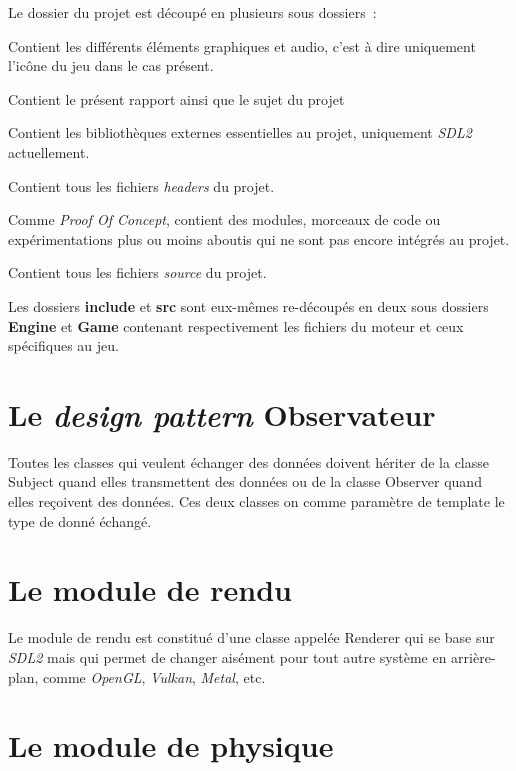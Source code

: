 \documentclass[10pt, french, a4paper]{report}
\newcommand{\class}[1]{{\codefont \NoAutoSpacing \mbox{#1}}}
\begin{document}
Le dossier du projet est découpé en plusieurs sous dossiers~:
\begin{description}[leftmargin=!,labelwidth=\widthof{\bfseries documents}]
	\item [assets] Contient les différents éléments graphiques et audio, c'est à dire 
	               uniquement l'icône du jeu dans le cas présent.
	\item [documents] Contient le présent rapport ainsi que le sujet du projet
	\item [external] Contient les bibliothèques externes essentielles au projet, 
	                 uniquement \textit{SDL2} actuellement.
	\item [include] Contient tous les fichiers \textit{headers} du projet.
	\item [poc] Comme \textit{Proof Of Concept}, contient des modules, morceaux de code 
				ou expérimentations plus ou moins aboutis qui ne sont pas encore intégrés
				au projet.
	\item [src] Contient tous les fichiers \textit{source} du projet.
\end{description}

Les dossiers \textbf{include} et \textbf{src} sont eux-mêmes re-découpés en deux sous dossiers \textbf{Engine} et \textbf{Game} contenant respectivement les fichiers
du moteur et ceux spécifiques au jeu.

\section{Le \textit{design pattern} Observateur}

Toutes les classes qui veulent échanger des données doivent hériter de la 
classe \class{Subject} quand elles transmettent des données ou de la 
classe \class{Observer} quand elles reçoivent des données. Ces deux classes on comme 
paramètre de template le type de donné échangé.

\section{Le module de rendu}

Le module de rendu est constitué d'une classe appelée \class{Renderer} qui 
se base sur \textit{SDL2} mais qui permet de changer aisément pour tout autre 
système en arrière-plan, comme \textit{OpenGL}, \textit{Vulkan}, \textit{Metal}, etc. 


\section{Le module de physique}
\end{document}
